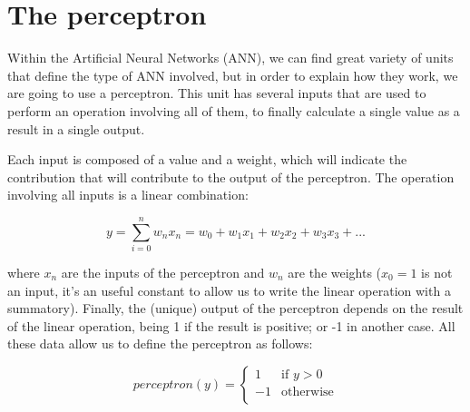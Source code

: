 
\section{The perceptron}
Within the Artificial Neural Networks (ANN), we can find great variety of units that define the type of ANN involved, but in order to explain how they work, we are going to use a perceptron. This unit has several inputs that are used to perform an operation involving all of them, to finally calculate a single value as a result in a single output.

	Each input is composed of a value and a weight, which will indicate the contribution that will contribute to the output of the perceptron. The operation involving all inputs is a linear combination:

	\begin{equation}
	    \label{linear_combination}
	        y=\sum_{i=0}^{n} w_n x_n = w_0 + w_1 x_1 + w_2 x_2 + w_3 x_3 + ...%
	\end{equation}

	where $x_n$ are the inputs of the perceptron and $w_n$ are the weights ($x_0=1$ is not an input, it's an useful constant to allow us to write the linear operation with a summatory). Finally, the (unique) output of the perceptron depends on the result of the linear operation, being 1 if the result is positive; or -1 in another case. All these data allow us to define the perceptron as follows:

	\begin{equation}
	    \label{perceptron_rule}
		perceptron(y) =
			\begin{cases}
		     	1 & \text{if $y>0$} \\
		        -1 & \text{otherwise} \\
			\end{cases}
	\end{equation}

